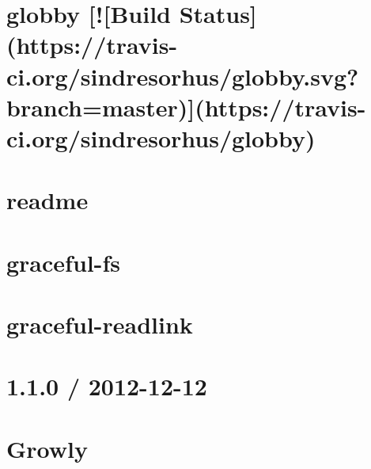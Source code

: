 \documentclass[twoside]{book}
\newcommand{\+}{\discretionary{\mbox{\scriptsize$\hookleftarrow$}}{}{}}
\begin{document}
\chapter{globby \mbox{[}!\mbox{[}Build Status\mbox{]}(https\+://travis-\/ci.org/sindresorhus/globby.svg?branch=master)\mbox{]}(https\+://travis-\/ci.org/sindresorhus/globby)}
\label{md__c_1_workspace_demo_src_main_script_node_modules_globby_readme}

\chapter{readme}
\label{md__c_1_workspace_demo_src_main_script_node_modules_got_readme}

\chapter{graceful-\/fs}
\label{md__c_1_workspace_demo_src_main_script_node_modules_graceful-fs__r_e_a_d_m_e}

\chapter{graceful-\/readlink}
\label{md__c_1_workspace_demo_src_main_script_node_modules_graceful-readlink__r_e_a_d_m_e}

\chapter{1.1.0 / 2012-\/12-\/12}
\label{md__c_1_workspace_demo_src_main_script_node_modules_growly__h_i_s_t_o_r_y}

\chapter{Growly}
\label{md__c_1_workspace_demo_src_main_script_node_modules_growly__r_e_a_d_m_e}

\end{document}
